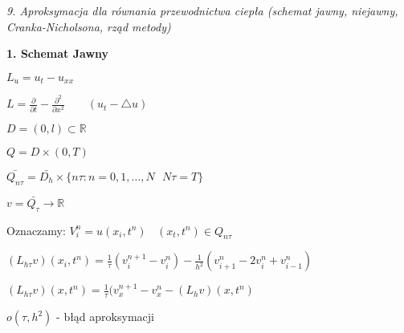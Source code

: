 \textit{9. Aproksymacja dla równania przewodnictwa ciepła (schemat jawny, niejawny, Cranka-Nicholsona, rząd metody)}

\textbf{1. Schemat Jawny}

$L_u = u_t - u_{xx}$

$L = \frac{\partial}{\partial t} - \frac{\partial^2}{\partial x^2}\ \ \ \ \ \ \ \ \ (u_t - \bigtriangleup u)$

$D = (0,l) \subset \mathbb{R}$

$Q = D \times (0,T)$

$\bar{Q_{n\tau}} = \bar{D_h} \times \{ n\tau : n = 0, 1, ..., N\ \ \ N\tau = T\}$

$v = \bar{Q_\tau} \rightarrow \mathbb{R}$

Oznaczamy: $V^n_i = u(x_i,t^n)\ \ \ \ (x_t,t^n) \in Q_{n\tau}$

$(L_{h\tau} v)(x_i, t^n) = \frac{1}{\tau} (v^{n+1}_i - v^n_i) - \frac{1}{h^2} (v^n_{i+1} - 2v^n_i + v^n_{i-1})$

$(L_{h\tau} v)(x, t^n) = \frac{1}{\tau} (v^{n+1}_x - v^n_x - (L_h v)(x, t^n)$

$o(\tau, h^2)$ - błąd aproksymacji